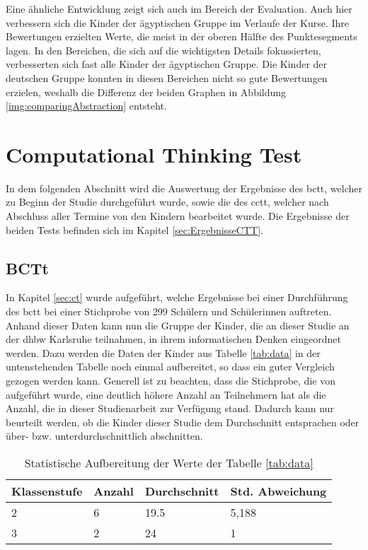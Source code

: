 Eine ähnliche Entwicklung zeigt sich auch im Bereich der Evaluation. Auch hier verbessern sich die Kinder der ägyptischen Gruppe im Verlaufe der Kurse. Ihre Bewertungen erzielten Werte, die meist in der oberen Hälfte des Punktesegments lagen. In den Bereichen, die sich auf die wichtigsten Details fokussierten, verbesserten sich fast alle Kinder der ägyptischen Gruppe. Die Kinder der deutschen Gruppe konnten in diesen Bereichen nicht so gute Bewertungen erzielen, weshalb die Differenz der beiden Graphen in Abbildung \ref{img:comparingAbstraction} entsteht.

\section{Computational Thinking Test}
	In dem folgenden Abschnitt wird die Auswertung der Ergebnisse des \acrshort{bctt}, welcher zu Beginn der Studie durchgeführt wurde, sowie die des \acrshort{cctt}, welcher nach Abschluss aller Termine von den Kindern bearbeitet wurde. Die Ergebnisse der beiden Tests befinden sich im Kapitel \ref{sec:ErgebnisseCTT}.
	\subsection{BCTt}
	In Kapitel \ref{sec:ct} wurde aufgeführt, welche Ergebnisse bei einer Durchführung des \acrshort{bctt} bei einer Stichprobe von 299 Schülern und Schülerinnen auftreten. Anhand dieser Daten kann nun die Gruppe der Kinder, die an dieser Studie an der \acrshort{dhbw} Karlsruhe teilnahmen, in ihrem informatischen Denken eingeordnet werden. Dazu werden die Daten der Kinder aus Tabelle \ref{tab:data} in der untenstehenden Tabelle noch einmal aufbereitet, so dass ein guter Vergleich gezogen werden kann. Generell ist zu beachten, dass die Stichprobe, die von \citeauthor{bcct} aufgeführt wurde, eine deutlich höhere Anzahl an Teilnehmern hat als die Anzahl, die in dieser Studienarbeit zur Verfügung stand. Dadurch kann nur beurteilt werden, ob die Kinder dieser Studie dem Durchschnitt entsprachen oder über- bzw. unterdurchschnittlich abschnitten.
	\begin{table}[H]
		\centering
		\begin{tabular}{|l|l|l|l|}
			\hline
			\rowcolor[HTML]{C0C0C0} 
			\textbf{Klassenstufe} & \textbf{Anzahl} & \textbf{Durchschnitt} & \textbf{Std. Abweichung} \\ \hline
			2                     & 6               & 19.5                  & 5,188                    \\ \hline
			3                     & 2               & 24                    & 1                        \\ \hline
		\end{tabular}
	\label{tab:statisticAufbereitung}
	\caption{Statistische Aufbereitung der Werte der Tabelle \ref{tab:data}}
	\end{table}


